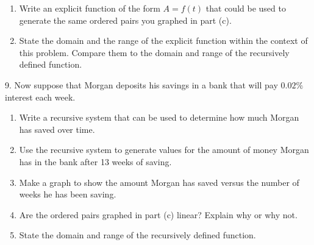 \documentclass[10pt,]{book}
\theoremstyle{plain}
\theoremstyle{definition}
\theoremstyle{definition}
\theoremstyle{definition}
\numberwithin{equation}{section}
\begin{document}
\begin{exerciselist}
\begin{enumerate}[label=(\alph*)]
\item\hypertarget{li-38}{}Write an explicit function of the form \(A=f(t)\) that could be used to generate the same ordered pairs you graphed in part (c).%
\item\hypertarget{li-39}{}State the domain and the range of the explicit function within the context of this problem.  Compare them to the domain and range of the recursively defined function.%
\end{enumerate}
%
\par\smallskip
\item[9.]\hypertarget{exercise-11}{}\hypertarget{p-29}{}%
Now suppose that Morgan deposits his savings in a bank that will pay \(0.02\%\) interest each week. \leavevmode%
\begin{enumerate}[label=(\alph*)]
\item\hypertarget{li-40}{}Write a recursive system that can be used to determine how much Morgan has saved over time.%
\item\hypertarget{li-41}{}Use the recursive system to generate values for the amount of money Morgan has in the bank after 13 weeks of saving.%
\item\hypertarget{li-42}{}Make a graph to show the amount Morgan has saved versus the number of weeks he has been saving.%
\item\hypertarget{li-43}{}Are the ordered pairs graphed in part (c) linear?  Explain why or why not.%
\item\hypertarget{li-44}{}State the domain and range of the recursively defined function.%
\end{enumerate}
%
\par\smallskip
\end{exerciselist}
\typeout{************************************************}
\typeout{************************************************}
\end{document}
